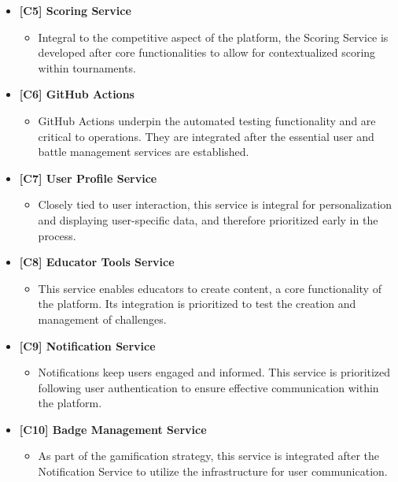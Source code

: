\begin{itemize}
    \item \textbf{[C5] Scoring Service}
    \begin{itemize}
        \item Integral to the competitive aspect of the platform, the Scoring Service is developed after core functionalities to allow for contextualized scoring within tournaments.
    \end{itemize}

    \item \textbf{[C6] GitHub Actions}
    \begin{itemize}
        \item GitHub Actions underpin the automated testing functionality and are critical to operations. They are integrated after the essential user and battle management services are established.
    \end{itemize}
    
    \item \textbf{[C7] User Profile Service}
    \begin{itemize}
        \item Closely tied to user interaction, this service is integral for personalization and displaying user-specific data, and therefore prioritized early in the process.
    \end{itemize}
    
    \item \textbf{[C8] Educator Tools Service}
    \begin{itemize}
        \item This service enables educators to create content, a core functionality of the platform. Its integration is prioritized to test the creation and management of challenges.
    \end{itemize}

    
    \item \textbf{[C9] Notification Service}
    \begin{itemize}
        \item Notifications keep users engaged and informed. This service is prioritized following user authentication to ensure effective communication within the platform.
    \end{itemize}

    \item \textbf{[C10] Badge Management Service}
    \begin{itemize}
        \item As part of the gamification strategy, this service is integrated after the Notification Service to utilize the infrastructure for user communication.
    \end{itemize}
\end{itemize}

